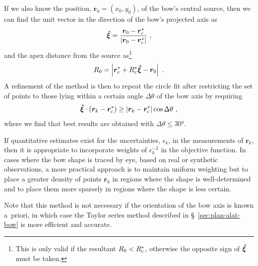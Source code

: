 If we also know the position, \(\bm{r}_0 = (x_0, y_0)\), of the bow's
central source, then we can find the unit vector in the direction of
the bow's projected axis as
\begin{equation}
  \label{eq:rcurv-axis-vector}
  \bm{\hat{\xi}} = \frac {\bm{r}_0 - \bm{r}_{\mathrm{c}}^*} { \lvert\bm{r}_0 - \bm{r}_{\mathrm{c}}^*\rvert} \ , 
\end{equation}
and the apex distance from the source as\footnote{%
  This is only valid if the resultant \(R_0 < R_{\mathrm{c}}^*\), otherwise
  the opposite sign of \(\bm{\hat{\xi}}\) must be taken.}
\begin{equation}
  \label{eq:rcurv-apex-distance}
  R_0 = \Abs{\bm{r}_{\C}^* + R_{\C}^* \uvec{\xi} - \bm{r}_0} \ .
\end{equation}
A refinement of the method is then to repeat the circle fit after
restricting the set of points to those lying within a certain angle
\(\Delta\theta\) of the bow axis by requiring
\begin{equation}
  \label{eq:rcurv-delta-theta}
  \bm{\hat{\xi}} \cdot 
  {\left( \bm{r}_k - \bm{r}_{\ensuremath{\mathrm{c}}}^* \right) }
  \ge   {\left\lvert\bm{r}_k - \bm{r}_{\ensuremath{\mathrm{c}}}^*\right\rvert}
  \cos \Delta\theta \ ,
\end{equation}
where we find that best results are obtained with \(\Delta\theta \le \ang{30}\).

If quantitative estimates exist for the uncertainties, \(\epsilon_k\), in the
measurements of \(\bm{r}_k\), then it is appropriate to incorporate
weights of \(\epsilon_k^{-2}\) in the objective function.  In cases where the
bow shape is traced by eye, based on real or synthetic observations, a
more practical approach is to maintain uniform weighting but to place
a greater density of points \(\bm{r}_k\) in regions where the shape is
well-determined and to place them more sparsely in regions where the
shape is less certain.

Note that this method is not necessary if the orientation of the bow
axis is known a~priori, in which case the Taylor series method
described in \S~\ref{sec:plan-alat-bow} is more efficient and
accurate.

